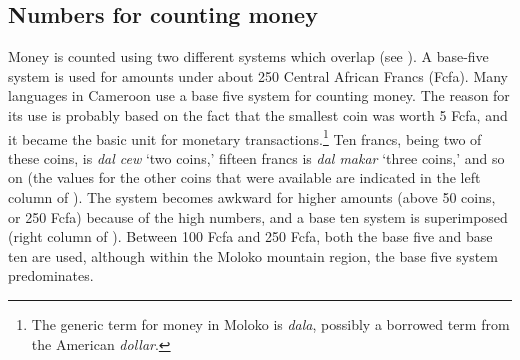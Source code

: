 \subsection{Numbers for counting money}\label{sec:3.3.2}
\hypertarget{RefHeading1211061525720847}{}
Money is counted using two different systems which overlap (see ). A base-five system is used for amounts under about 250 Central African Francs (Fcfa). Many languages in Cameroon use a base five system for counting money. The reason for its use is probably based on the fact that the smallest coin was worth 5 Fcfa, and it became the basic unit for monetary transactions.\footnote{The generic term for money in Moloko is \textit{dala}, possibly a borrowed term from the American \textit{dollar}.} Ten francs, being two of these coins, is \textit{dal cew} ‘two coins,’ fifteen francs is \textit{dal makar} ‘three coins,’ and so on (the values for the other coins that were available are indicated in the left column of ). The system becomes awkward for higher amounts (above 50 coins, or 250 Fcfa) because of the high numbers, and a base ten system is superimposed (right column of ). Between 100 Fcfa and 250 Fcfa, both the base five and base ten are used, although within the Moloko mountain region, the base five system predominates. 

